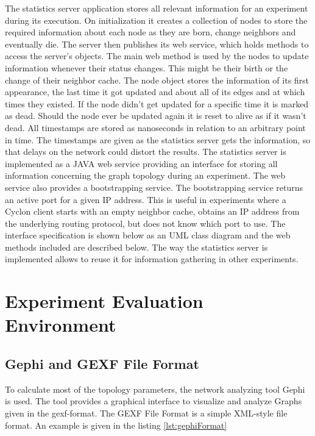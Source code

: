 The statistics server application stores all relevant information for an
experiment during its execution. On initialization it creates a collection of
nodes to store the required information about each node as they are born,
change neighbors and eventually die. The server then publishes its web service,
which holds methods to access the server's objects. The main web method is used
by the nodes to update information whenever their status changes. This might be
their birth or the change of their neighbor cache. The node object stores the
information of its first appearance, the last time it got updated and about all
of its edges and at which times they existed. If the node didn't get updated for
a specific time it is marked as dead. Should the node ever be updated again it is
reset to alive as if it wasn't dead. All timestamps are stored as nanoseconds in
relation to an arbitrary point in time. The timestamps are given as the
statistics server gets the information, so that delays on the network could
distort the results.
The statistics server is implemented as a JAVA web service providing an
interface for storing all information concerning the graph topology during an
experiment. The web service also provides a bootstrapping service. The
bootstrapping service returns an active port for a given IP address. This is
useful in experiments where a Cyclon client starts with an empty neighbor
cache, obtains an IP address from the underlying routing protocol, but does not
know which port to use. The interface specification is shown below
as an UML class diagram and the web methods included are described below.
The way the statistics server is implemented allows to reuse it for information
gathering in other experiments. 

\section{Experiment Evaluation Environment}

\subsection{Gephi and GEXF File Format}
To calculate most of the topology parameters, the network analyzing tool Gephi
is used. The tool provides a graphical interface to visualize and analyze Graphs
given in the gexf-format. The GEXF File Format is a simple XML-style file
format. An example is given in the listing \ref{lst:gephiFormat}\\

